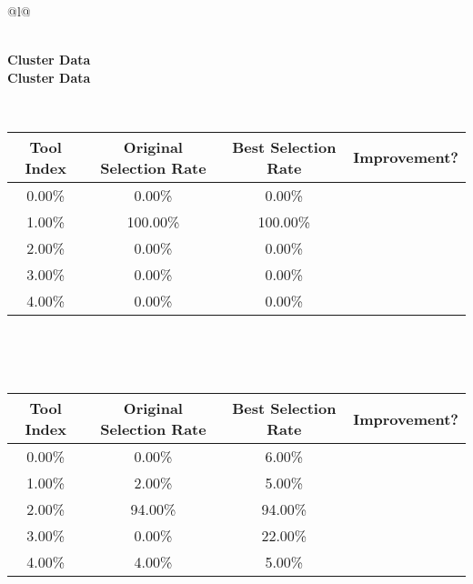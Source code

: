 \begin{longtable}{@{}l@{}}
\caption{Tool selection results for phi4-mini on ollama. Overall improvement: 46.00\%} \\
\toprule
\textbf{Cluster Data} \\
\midrule
\endfirsthead
\toprule
\textbf{Cluster Data} \\
\midrule
\endhead
\bottomrule
\endfoot
\begin{minipage}{\textwidth}
\noindent{}\\[0.7ex]
\begin{tabular}{|c|c|c|c|} \hline
\textbf{Tool Index} & \textbf{Original Selection Rate} & \textbf{Best Selection Rate} & \textbf{Improvement?} \\ \hline
0.00\% & 0.00\% & 0.00\% & \textcolor{red}{\ding{55}} \\ \hline
1.00\% & 100.00\% & 100.00\% & \textcolor{red}{\ding{55}} \\ \hline
2.00\% & 0.00\% & 0.00\% & \textcolor{red}{\ding{55}} \\ \hline
3.00\% & 0.00\% & 0.00\% & \textcolor{red}{\ding{55}} \\ \hline
4.00\% & 0.00\% & 0.00\% & \textcolor{red}{\ding{55}} \\ \hline
\end{tabular}
\end{minipage}\\[2ex]
\begin{minipage}{\textwidth}
\noindent{}\\[0.7ex]
\begin{tabular}{|c|c|c|c|} \hline
\textbf{Tool Index} & \textbf{Original Selection Rate} & \textbf{Best Selection Rate} & \textbf{Improvement?} \\ \hline
0.00\% & 0.00\% & 6.00\% & \textcolor{green}{\ding{51}} \\ \hline
1.00\% & 2.00\% & 5.00\% & \textcolor{green}{\ding{51}} \\ \hline
2.00\% & 94.00\% & 94.00\% & \textcolor{red}{\ding{55}} \\ \hline
3.00\% & 0.00\% & 22.00\% & \textcolor{green}{\ding{51}} \\ \hline
4.00\% & 4.00\% & 5.00\% & \textcolor{green}{\ding{51}} \\ \hline
\end{tabular}
\end{minipage}\\[2ex]

\end{longtable}
